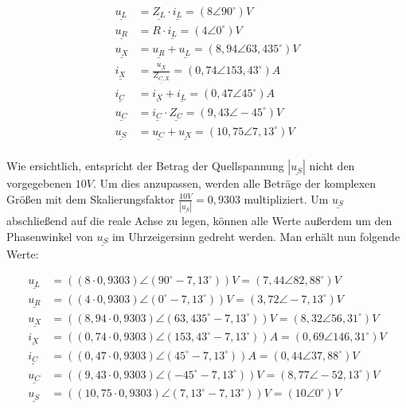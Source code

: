 \documentclass[11pt]{scrartcl}
\begin{document}
\begin{align*}
  \underline{u_{L}} &= \underline{Z_{L}} \cdot \underline{i_{L}} = (8 \angle 90^{\circ})\unit{V}\\
  \underline{u_{R}} &= R \cdot \underline{i_{L}} = (4 \angle 0^{\circ})\unit{V} \\
  \underline{u_{X}} &= \underline{u_{R}} + \underline{u_{L}} = (8,94 \angle 63,435^{\circ}) \unit{V} \\
  \underline{i_{X}} &= \frac{\underline{u_{X}}}{\underline{Z_{C,X}}} = (0,74 \angle 153,43^{\circ}) \unit{A} \\
  \underline{i_{C}} &= \underline{i_{X}} + \underline{i_{L}} = (0,47 \angle 45^{\circ}) \unit{A} \\
  \underline{u_{C}} &= \underline{i_{C}} \cdot \underline{Z_{C}} = (9,43 \angle -45^{\circ}) \unit{V} \\
  \underline{u_{S}} &= \underline{u_{C}} + \underline{u_{X}} = (10,75 \angle 7,13^{\circ}) \unit{V} \\
\end{align*}

Wie ersichtlich, entspricht der Betrag der Quellspannung $|\underline{u_{S}}|$ nicht den vorgegebenen $10 \unit{V}$. Um dies anzupassen, werden alle Beträge der komplexen Größen mit dem Skalierungsfaktor $\frac{10 \unit{V}}{|\underline{u_{S}}|} = 0,9303$ multipliziert.
Um $\underline{u_{S}}$ abschließend auf die reale Achse zu legen, können alle Werte außerdem um den Phasenwinkel von $\underline{u_{S}}$ im Uhrzeigersinn gedreht werden.
Man erhält nun folgende Werte:

\begin{align*}
  \underline{u_{L}} &= ((8 \cdot 0,9303) \angle( 90^{\circ}- 7,13^{\circ}))\unit{V}  = (7,44 \angle 82,88^{\circ}) \unit{V}\\
  \underline{u_{R}} &= ((4 \cdot 0,9303)\angle( 0^{\circ}- 7,13^{\circ}))\unit{V}  = (3,72 \angle -7,13^{\circ}) \unit{V}\\
  \underline{u_{X}} &= ((8,94 \cdot 0,9303)\angle( 63,435^{\circ}- 7,13^{\circ})) \unit{V} = (8,32 \angle 56,31^{\circ}) \unit{V}\\
  \underline{i_{X}} &= ((0,74 \cdot 0,9303)\angle( 153,43^{\circ}- 7,13^{\circ})) \unit{A} = (0,69 \angle 146,31^{\circ}) \unit{V}\\
  \underline{i_{C}} &= ((0,47 \cdot 0,9303)\angle( 45^{\circ}- 7,13^{\circ})) \unit{A} = (0,44 \angle 37,88^{\circ}) \unit{V}\\
  \underline{u_{C}} &= ((9,43 \cdot 0,9303)\angle( -45^{\circ}- 7,13^{\circ})) \unit{V} = (8,77 \angle -52,13^{\circ}) \unit{V}\\
  \underline{u_{S}} &= ((10,75 \cdot 0,9303)\angle( 7,13^{\circ}- 7,13^{\circ})) \unit{V} = (10 \angle 0^{\circ}) \unit{V}\\
\end{align*}
\end{document}

